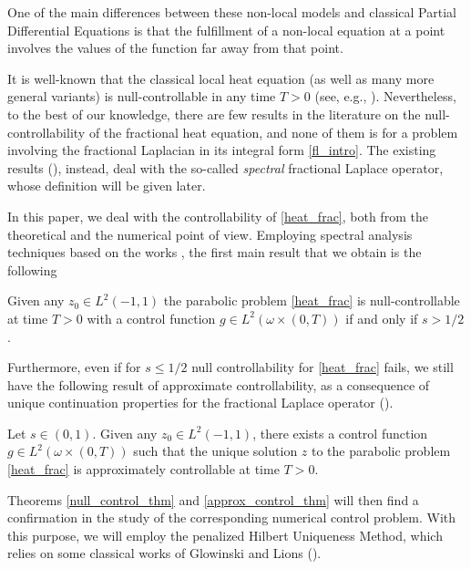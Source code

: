 One of the main differences between these non-local models and classical Partial Differential Equations is that the fulfillment of a non-local equation at a point involves the values of the function far away from that point.

It is well-known that the classical local heat equation (as well as many more general variants) is null-controllable in any time $T>0$ (see, e.g., \cite{fattorini1971exact,fursikov1996controllability,lebeau1995controle}). Nevertheless, to the best of our knowledge, there are few results in the literature on the null-controllability of the fractional heat equation, and none of them is for a problem involving the fractional Laplacian in its integral form \eqref{fl_intro}. The existing results (\cite{micu2006controllability,miller2006controllability}), instead, deal with the so-called \textit{spectral} fractional Laplace operator, whose definition will be given later. 

In this paper, we deal with the controllability of \eqref{heat_frac}, both from the theoretical and the numerical point of view. Employing spectral analysis techniques based on the works \cite{kulczycki2010spectral,kwasnicki2012eigenvalues}, the first main result that we obtain is the following

\begin{theorem}\label{null_control_thm}
Given any $z_0\in L^2(-1,1)$ the parabolic problem \eqref{heat_frac} is null-controllable at time $T>0$ with a control function $g\in L^2(\omega\times(0,T))$ if and only if $s>1/2$.  
\end{theorem}

Furthermore, even if for $s\leq 1/2$ null controllability for \eqref{heat_frac} fails, we still have the following result of approximate controllability, as a consequence of unique continuation properties for the fractional Laplace operator (\cite{fall2014unique}). 

\begin{theorem}\label{approx_control_thm}
Let $s\in(0,1)$. Given any $z_0\in L^2(-1,1)$, there exists a control function $g\in L^2(\omega\times(0,T))$ such that the unique solution $z$ to the parabolic problem \eqref{heat_frac} is approximately controllable at time $T>0$.
\end{theorem}

Theorems \ref{null_control_thm} and \eqref{approx_control_thm} will then find a confirmation in the study of the corresponding numerical control problem. With this purpose, we will employ the penalized Hilbert Uniqueness Method, which relies on some classical works of Glowinski and Lions (\cite{glowinski1995exact,glowinski2008exact}). 

